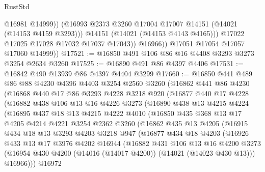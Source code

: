 \begin{lexlean}{RustStd}
\begin{coremodule}
                      @16981
                      @14999))
                  (@16993 @2373 @3260 @17004 @17007 @14151 (@14021 (@14153 @4159 @3293)))
                  @14151
                  (@14021 (@14153 @4143 @4165)))
                @17022
                @17025
                @17028
                @17032
                @17037
                @17043))
            @16966))
        @17051
        @17054
        @17057
        @17060
        @14999))
@17521 := @16850 @491 @106 @86 @16 @4408 @3293 @3273 @3254 @2634 @3260
@17525 := @16890 @491 @86 @4397 @4406
@17531 := @16842 @490 @13939 @86 @4397 @4404 @3299
@17660 := @16850
    @441
    @489
    @86
    @88
    @4230
    @4396
    @4403
    @3254
    @2560
    @3260
    (@16862
      @441
      @86
      @4230
      (@16868
        @440
        @17
        @86
        @3293
        @4228
        @3218
        @920
        (@16877
          @440
          @17
          @4228
          (@16882
            @438
            @106
            @13
            @16
            @4226
            @3273
            (@16890
              @438
              @13
              @4215
              @4224
              (@16895
                @437
                @18
                @13
                @4215
                @4222
                @4010
                (@16850
                  @435
                  @368
                  @13
                  @17
                  @4205
                  @4214
                  @4221
                  @3254
                  @2362
                  @3260
                  (@16862
                    @435
                    @13
                    @4205
                    (@16915
                      @434
                      @18
                      @13
                      @3293
                      @4203
                      @3218
                      @947
                      (@16877
                        @434
                        @18
                        @4203
                        (@16926
                          @433
                          @13
                          @17
                          @3976
                          @4202
                          @16944
                          (@16882
                            @431
                            @106
                            @13
                            @16
                            @4200
                            @3273
                            (@16954 @430 @4200 (@14016 (@14017 @4200)) (@14021 (@14023 @430 @13)))
                            @16966)))
                      @16972

\end{coremodule}
\end{lexlean}
